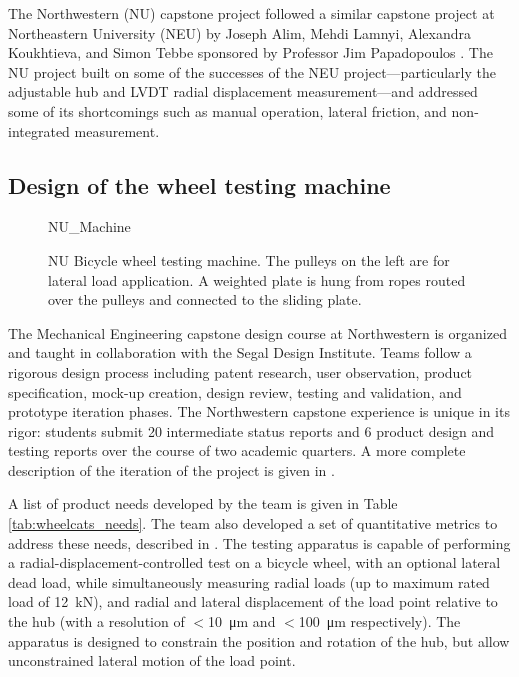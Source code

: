 \documentclass[\rootdir/thesis.tex]{subfiles}
\begin{document}
The Northwestern (NU) capstone project followed a similar capstone project at Northeastern University (NEU) by Joseph Alim, Mehdi Lamnyi, Alexandra Koukhtieva, and Simon Tebbe sponsored by Professor Jim Papadopoulos \cite{Alim2016}. The NU project built on some of the successes of the NEU project---particularly the adjustable hub and LVDT radial displacement measurement---and addressed some of its shortcomings such as manual operation, lateral friction, and non-integrated measurement.

\subsection{Design of the wheel testing machine}

\begin{figure}
\centering
{NU_Machine}
\caption{NU Bicycle wheel testing machine. The pulleys on the left are for lateral load application. A weighted plate is hung from ropes routed over the pulleys and connected to the sliding plate.}
\label{fig:NU_Machine}
\end{figure}

The Mechanical Engineering capstone design course at Northwestern is organized and taught in collaboration with the Segal Design Institute. Teams follow a rigorous design process including patent research, user observation, product specification, mock-up creation, design review, testing and validation, and prototype iteration phases. The Northwestern capstone experience is unique in its rigor: students submit 20 intermediate status reports and 6 product design and testing reports over the course of two academic quarters. A more complete description of the iteration of the project is given in \cite{WheelCats2018}.

A list of product needs developed by the team is given in Table \ref{tab:wheelcats_needs}. The team also developed a set of quantitative metrics to address these needs, described in \cite{WheelCats2018}. The testing apparatus is capable of performing a radial-displacement-controlled test on a bicycle wheel, with an optional lateral dead load, while simultaneously measuring radial loads (up to maximum rated load of \SI{12}{\kilo\newton}), and radial and lateral displacement of the load point relative to the hub (with a resolution of $<$\SI{10}{\micro\meter} and $<$\SI{100}{\micro\meter} respectively). The apparatus is designed to constrain the position and rotation of the hub, but allow unconstrained lateral motion of the load point.
\end{document}
